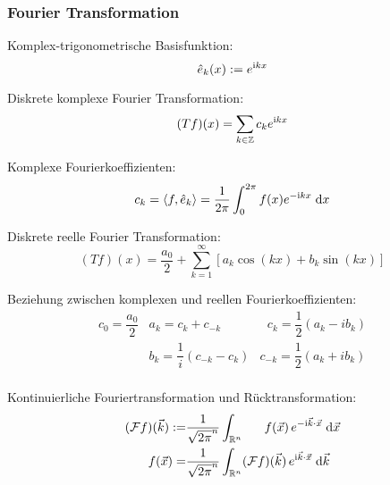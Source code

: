 		\subsubsection{Fourier Transformation}
			\noindent
			Komplex-trigonometrische Basisfunktion:
			\begin{equation}
				\hat{e}_k(x):=e^{\mathrm{i} kx}
			\end{equation}

			\noindent
			Diskrete komplexe Fourier Transformation:
			\begin{equation}
				(Tf)(x)=\sum_{k\in\mathbb{Z}}c_k e^{\mathrm{i} kx}
			\end{equation}

			\noindent
			Komplexe Fourierkoeffizienten:
			\begin{equation}
				c_k = \left<f,\hat{e}_k\right>=\frac{1}{2\pi}\int_0^{2\pi}f(x)e^{-\mathrm{i} kx}\;\mathrm{d} x
			\end{equation}

			\noindent
			Diskrete reelle Fourier Transformation:
			\begin{equation}
				(Tf)(x)=\frac{a_0}{2}+\sum_{k=1}^{\infty}\left[a_k \cos(kx) + b_k \sin(kx) \right]
			\end{equation}

			\noindent
			Beziehung zwischen komplexen und reellen Fourierkoeffizienten:
			\begin{equation}
				\begin{array}{clc}
					c_0 = \dfrac{a_0}{2} & a_k = c_k+c_{-k} & \phantom{_{-}}c_k = \dfrac{1}{2}\left(a_k-ib_k\right) \\ [6pt]
					& b_k = \dfrac{1}{i}\left(c_{-k}-c_{k}\right) & c_{-k} = \dfrac{1}{2}\left(a_k+ib_k\right) \\
				\end{array}
			\end{equation}

			\noindent
			Kontinuierliche Fouriertransformation und Rücktransformation:
			\begin{equation}
				\begin{aligned}
					(\mathcal{F}f)(\vec{k}) :=& \frac{1}{\sqrt{2\pi}^n}\int_{\mathbb{R}^n} \phantom{(\mathcal{F})}f(\vec{x})\, e^{-\i\vec{k}\cdot\vec{x}}\;\diff\vec{x} \\
					\phantom{(\mathcal{F})}f(\vec{x}) =& \frac{1}{\sqrt{2\pi}^n}\int_{\mathbb{R}^n} (\mathcal{F}f)(\vec{k}) \,e^{\i\vec{k}\cdot\vec{x}}\;\diff \vec{k} \\
				\end{aligned}
			\end{equation}

